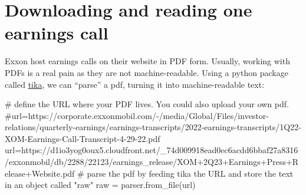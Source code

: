\documentclass[
  letterpaper,
  DIV=11,
  numbers=noendperiod]{scrreprt}
\newenvironment{Shaded}{\begin{snugshade}}{\end{snugshade}}
\newcommand{\CommentTok}[1]{\textcolor[rgb]{0.37,0.37,0.37}{#1}}
\newcommand{\NormalTok}[1]{\textcolor[rgb]{0.00,0.23,0.31}{#1}}
\newcommand{\OperatorTok}[1]{\textcolor[rgb]{0.37,0.37,0.37}{#1}}
\newcommand{\StringTok}[1]{\textcolor[rgb]{0.13,0.47,0.30}{#1}}
\begin{document}
\hypertarget{downloading-and-reading-one-earnings-call}{%
\section{Downloading and reading one earnings
call}\label{downloading-and-reading-one-earnings-call}}

Exxon host earnings calls on their website in PDF form. Usually, working
with PDFs is a real pain as they are not machine-readable. Using a
python package called
\href{https://www.geeksforgeeks.org/parsing-pdfs-in-python-with-tika/}{tika},
we can ``parse'' a pdf, turning it into machine-readable text:

\begin{Shaded}
\begin{Highlighting}[]
\CommentTok{\# define the URL where your PDF lives. You could also upload your own pdf.}
\CommentTok{\#url=\textquotesingle{}https://corporate.exxonmobil.com/{-}/media/Global/Files/investor{-}relations/quarterly{-}earnings/earnings{-}transcripts/2022{-}earnings{-}transcripts/1Q22{-}XOM{-}Earnings{-}Call{-}Transcript{-}4{-}29{-}22.pdf\textquotesingle{}}
\NormalTok{url}\OperatorTok{=}\StringTok{\textquotesingle{}https://d1io3yog0oux5.cloudfront.net/\_74d009918ead0ec6acdd6bbaf27a8316/exxonmobil/db/2288/22123/earnings\_release/XOM+2Q23+Earnings+Press+Release+Website.pdf\textquotesingle{}}
\CommentTok{\# parse the pdf by feeding tika the URL and store the text in an object called "raw" }
\NormalTok{raw }\OperatorTok{=}\NormalTok{ parser.from\_file(url)}
\end{Highlighting}
\end{Shaded}
\end{document}
